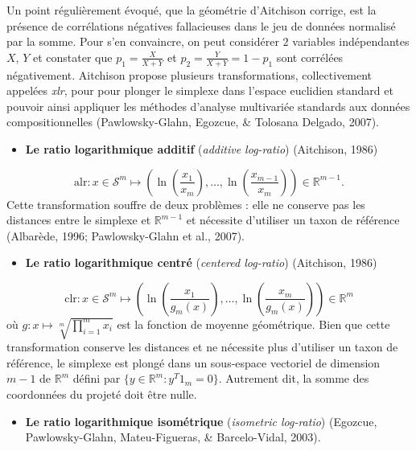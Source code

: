 \documentclass[12pt,a4paper]{reedthesis}
\providecommand{\tightlist}{%
  \setlength{\itemsep}{0pt}\setlength{\parskip}{0pt}}
\newcommand \RR {\mathbb{R}}
\theoremstyle{definition}
\theoremstyle{definition}
\theoremstyle{definition}
\theoremstyle{remark}
\begin{document}
Un point régulièrement évoqué, que la géométrie d'Aitchison corrige, est la présence de corrélations négatives fallacieuses dans le jeu de données normalisé par la somme. Pour s'en convaincre, on peut considérer \(2\) variables indépendantes \(X\), \(Y\) et constater que \(p_1 = \frac{X}{X+Y}\) et \(p_2 = \frac{Y}{X+Y} = 1 - p_1\) sont corrélées négativement. Aitchison propose plusieurs transformations, collectivement appelées \emph{xlr}, pour pour plonger le simplexe dans l'espace euclidien standard et pouvoir ainsi appliquer les méthodes d'analyse multivariée standards aux données compositionnelles (Pawlowsky-Glahn, Egozcue, \& Tolosana Delgado, 2007).
\begin{itemize}
\tightlist
\item
  \textbf{Le ratio logarithmique additif} (\emph{additive log-ratio}) (Aitchison, 1986)
\end{itemize}
\begin{equation*}
\text{alr}: x \in \mathcal{S}^m \mapsto \left(\ln\left(\frac{x_1}{x_m}\right), \ldots, \ln\left(\frac{x_{m-1}}{x_m}\right) \right) \in \RR^{m-1}.
\end{equation*}
Cette transformation souffre de deux problèmes : elle ne conserve pas les distances entre le simplexe et \(\RR^{m-1}\) et nécessite d'utiliser un taxon de référence (Albarède, 1996; Pawlowsky-Glahn et al., 2007).
\begin{itemize}
\tightlist
\item
  \textbf{Le ratio logarithmique centré} (\emph{centered log-ratio}) (Aitchison, 1986)
\end{itemize}
\begin{equation*}
\text{clr}: x \in \mathcal{S}^m \mapsto \left(\ln\left(\frac{x_1}{g_m(x)}\right), \ldots, \ln\left(\frac{x_{m}}{g_m(x)}\right) \right) \in \RR^{m}
\end{equation*}
où \(g:x\mapsto \sqrt[m]{\prod_{i=1}^m x_i}\) est la fonction de moyenne géométrique.
Bien que cette transformation conserve les distances et ne nécessite plus d'utiliser un taxon de référence, le simplexe est plongé dans un sous-espace vectoriel de dimension \(m-1\) de \(\RR^m\) défini par \(\{y \in \RR^m: y^T 1_m = 0\}\). Autrement dit, la somme des coordonnées du projeté doit être nulle.
\begin{itemize}
\tightlist
\item
  \textbf{Le ratio logarithmique isométrique} (\emph{isometric log-ratio}) (Egozcue, Pawlowsky-Glahn, Mateu-Figueras, \& Barcelo-Vidal, 2003).
\end{itemize}
\end{document}
